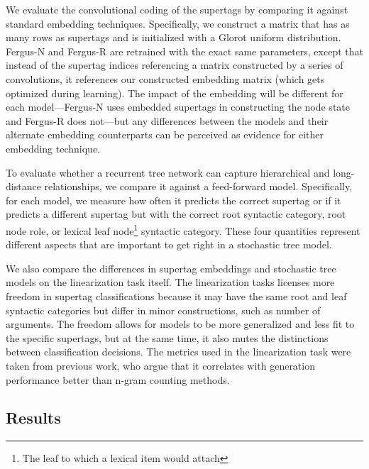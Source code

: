 \documentclass[11pt]{article}
\begin{document}
We evaluate the convolutional coding of the supertags by comparing it against standard embedding techniques.
%
Specifically, we construct a matrix that has as many rows as supertags and is initialized with a Glorot uniform distribution.
%
Fergus-N and Fergus-R are retrained with the exact same parameters, except that instead of the supertag indices referencing a matrix constructed by a series of convolutions, it references our constructed embedding matrix (which gets optimized during learning). 
%
The impact of the embedding will be different for each model---Fergus-N uses embedded supertags in constructing the node state and Fergus-R does not---but any differences between the models and their alternate embedding counterparts can be perceived as evidence for either embedding technique.  


To evaluate whether a recurrent tree network can capture hierarchical and long-distance relationships, we compare it against a feed-forward model. 
%
Specifically, for each model, we measure how often it predicts the correct supertag or if it predicts a different supertag but with the correct root syntactic category, root node role, or lexical leaf node\footnote{The leaf to which a lexical item would attach} syntactic category.
%
These four quantities represent different aspects that are important to get right in a stochastic tree model.



We also compare the differences in supertag embeddings and stochastic tree models on the linearization task itself.
%
The linearization tasks licenses more freedom in supertag classifications because it may have the same root and leaf syntactic categories but differ in minor constructions, such as number of arguments. 
%
The freedom allows for models to be more generalized and less fit to the specific supertags, but at the same time, it also mutes the distinctions between classification decisions.
%
The metrics used in the linearization task were taken from previous work, who argue that it correlates with generation performance better than n-gram counting methods. 


\subsection{Results}
\end{document}
